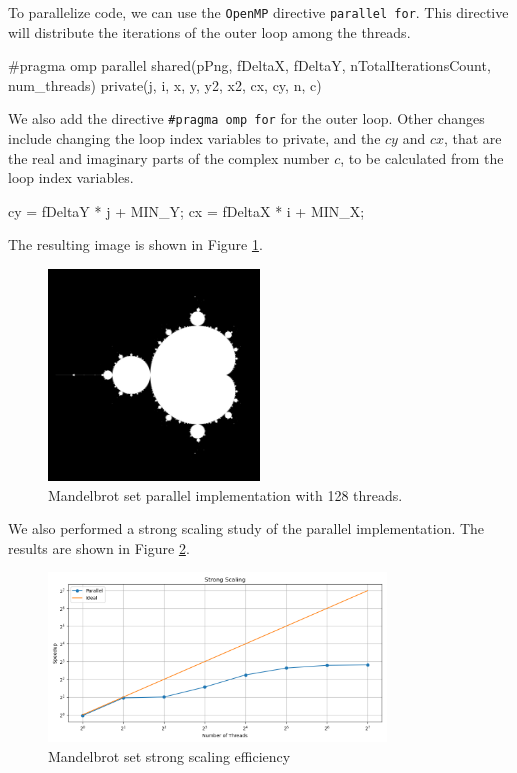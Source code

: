 \documentclass[unicode,11pt,a4paper,oneside,numbers=endperiod,openany]{scrartcl}
\begin{document}
To parallelize code, we can use the \texttt{OpenMP} directive \texttt{parallel
for}. This directive will distribute the iterations of the outer loop among the
threads.
\begin{cppverbatim}
#pragma omp parallel shared(pPng, fDeltaX, fDeltaY, nTotalIterationsCount, num_threads) private(j, i, x, y, y2, x2, cx, cy, n, c)
\end{cppverbatim}
We also add the directive \texttt{\#pragma omp for} for the outer loop.
Other changes include changing the loop index variables to private, and the $cy$
and $cx$, that are the real and imaginary parts of the complex number $c$, to be
calculated from the loop index variables.
\begin{cppverbatim}
cy = fDeltaY * j + MIN_Y;
cx = fDeltaX * i + MIN_X;
\end{cppverbatim}
The resulting image is shown in Figure \ref{fig:mandelbrot-parallel}.
\begin{figure}[h]
  \centering
  \includegraphics[width=0.5\textwidth]{../mandel/mandel_par.png}
  \caption{Mandelbrot set parallel implementation with 128 threads.}
  \label{fig:mandelbrot-parallel}
\end{figure}
We also performed a strong scaling study of the parallel implementation. The
results are shown in Figure \ref{fig:mandelbrot-strong-scaling}.
\begin{figure}[h]
  \centering
  \includegraphics[width=0.8\textwidth]{../mandel/strong_scaling_plot.png}
  \caption{Mandelbrot set strong scaling efficiency}
  \label{fig:mandelbrot-strong-scaling}
\end{figure}
\end{document}
